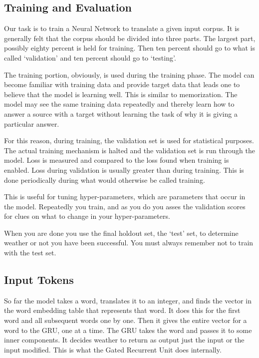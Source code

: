 \subsection{Training and Evaluation}
Our task is to train a Neural Network to translate a given input corpus. It is generally felt that the corpus should be divided into three parts. The largest part, possibly eighty percent is held for training. Then ten percent should go to what is called `validation' and ten percent should go to `testing'.

The training portion, obviously, is used during the training phase. The model can become familiar with training data and provide target data that leads one to believe that the model is learning well. This is similar to memorization. The model may see the same training data repeatedly and thereby learn how to answer a source with a target without learning the task of why it is giving a particular answer.

For this reason, during training, the validation set is used for statistical purposes. The actual training mechanism is halted and the validation set is run through the model. Loss is measured and compared to the loss found when training is enabled. Loss during validation is usually greater than during training. This is done periodically during what would otherwise be called training.

This is useful for tuning hyper-parameters, which are parameters that occur in the model. Repeatedly you train, and as you do you asses the validation scores for clues on what to change in your hyper-parameters. 

When you are done you use the final holdout set, the `test' set, to determine weather or not you have been successful. You must always remember not to train with the test set.

\subsection{Input Tokens}

So far the model takes a word, translates it to an integer, and finds the vector in the word embedding table that represents that word. It does this for the first word and all subsequent words one by one. Then it gives the entire vector for a word to the GRU, one at a time. The GRU takes the word and passes it to some inner components. It decides weather to return as output just the input or the input modified. This is what the Gated Recurrent Unit does internally.

